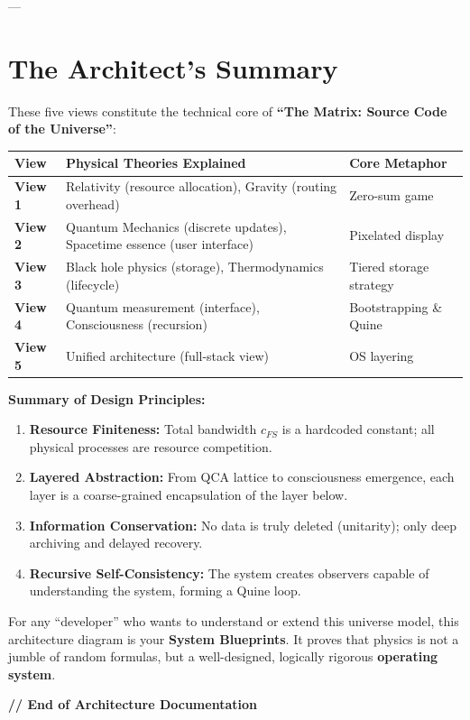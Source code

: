 ---

\section{The Architect's Summary}

These five views constitute the technical core of \textbf{``The Matrix: Source Code of the Universe''}:

\begin{table}[h]
\centering
\begin{tabular}{|l|l|l|}
\hline
\textbf{View} & \textbf{Physical Theories Explained} & \textbf{Core Metaphor} \\
\hline
\textbf{View 1} & Relativity (resource allocation), Gravity (routing overhead) & Zero-sum game \\
\hline
\textbf{View 2} & Quantum Mechanics (discrete updates), Spacetime essence (user interface) & Pixelated display \\
\hline
\textbf{View 3} & Black hole physics (storage), Thermodynamics (lifecycle) & Tiered storage strategy \\
\hline
\textbf{View 4} & Quantum measurement (interface), Consciousness (recursion) & Bootstrapping \& Quine \\
\hline
\textbf{View 5} & Unified architecture (full-stack view) & OS layering \\
\hline
\end{tabular}
\end{table}

\textbf{Summary of Design Principles:}

\begin{enumerate}
\item \textbf{Resource Finiteness:} Total bandwidth $c_{FS}$ is a hardcoded constant; all physical processes are resource competition.

\item \textbf{Layered Abstraction:} From QCA lattice to consciousness emergence, each layer is a coarse-grained encapsulation of the layer below.

\item \textbf{Information Conservation:} No data is truly deleted (unitarity); only deep archiving and delayed recovery.

\item \textbf{Recursive Self-Consistency:} The system creates observers capable of understanding the system, forming a Quine loop.
\end{enumerate}

For any ``developer'' who wants to understand or extend this universe model, this architecture diagram is your \textbf{System Blueprints}. It proves that physics is not a jumble of random formulas, but a well-designed, logically rigorous \textbf{operating system}.

\textbf{// End of Architecture Documentation}

